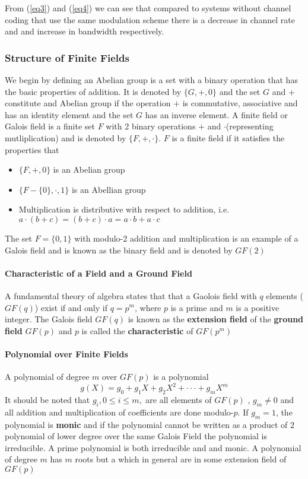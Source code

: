 \documentclass[fontsize=12pt]{article}
\begin{document}
 From (\ref{eq3}) and (\ref{eq4}) we can see that compared to systems without channel coding that use the same modulation scheme there is a decrease in channel rate and and increase in bandwidth respectively.
 
 \subsubsection{Structure of Finite Fields}
 
 We begin by defining an Abelian group is a set with a binary operation that has the basic properties of addition. It is denoted by $\{G,+,0\}$ and the set $G$ and $+$ constitute and Abelian group if the operation $+$ is commutative, associative and has an identity element and the set $G$ has an inverse element.
 \newpage
 A finite field or Galois field is a finite set $F$ with 2 binary operations $+$ and $\cdot$(representing mutliplication) and is denoted by $\{F, +,\cdot\}$. $F$ is a finite field if it satisfies the properties that 
 \begin{itemize}
 \item $\{F,+,0\}$ is an Abelian group
 \item $\{F - \{0\}, \cdot, 1 \}$ is an Abellian group
 \item Multiplication is distributive with respect to addition, i.e. $a\cdot(b+c) = (b+c)\cdot a = a\cdot b + a\cdot c$
 \end{itemize}
 The set $F=\{0,1\}$ with modulo-2 addition and multiplication is an example of a Galois field and is known as the binary field and is denoted by $GF(2)$
 
 \paragraph{Characteristic of a Field and a Ground Field}
 A fundamental theory of algebra states that that a Gaolois field with $q$ elements ($GF(q)$) exist if and only if $q=p^m$, where $p$ is a prime and $m$ is a positive integer. The Galois field $GF(q)$ is known as the \textbf{extension field} of the \textbf{ground field} $GF(p)$ and $p$ is called the \textbf{characteristic} of $GF(p^m)$
 
 \paragraph{Polynomial over Finite Fields}
 
 A polynomial of degree $m$ over $GF(p)$ is a polynomial 
 \begin{equation}
 g(X) = g_0 + g_1X + g_2X^2 + \cdot\cdot\cdot + g_mX^m
 \end{equation}
 It should be noted that $g_i, 0\leq i \leq m,$ are all elements of $GF(p)$ , $g_m\neq 0$ and all addition and multiplication of coefficients are done modulo-$p$. If $g_m=1$, the polynomial is \textbf{monic} and if the polynomial cannot be written as a product of $2$ polynomial of lower degree over the same Galois Field the polynomial is irreducible. A prime polynomial is both irreducible and and monic. A polynomial of degree $m$ has $m$ roots but a which in general are in some extension field of $GF(p)$
 
\end{document}
